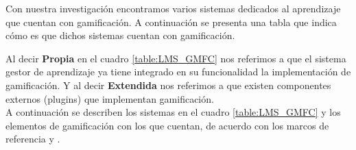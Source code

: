 Con nuestra investigación encontramos varios sistemas dedicados al aprendizaje que cuentan con gamificación. A continuación se presenta una tabla que indica cómo es que dichos sistemas cuentan con gamificación.
   
       
\noindent Al decir \textbf{Propia} en el cuadro \ref{table:LMS_GMFC} nos referimos a que el sistema gestor de aprendizaje ya tiene integrado en su funcionalidad la implementación  de gamificación. Y al decir \textbf{Extendida} nos referimos a que existen componentes externos (plugins) que implementan gamificación.\\
    
\noindent A continuación se describen los sistemas en el cuadro \ref{table:LMS_GMFC} y los elementos de gamificación con los que cuentan, de acuerdo con los marcos de referencia  y .
\clearpage
